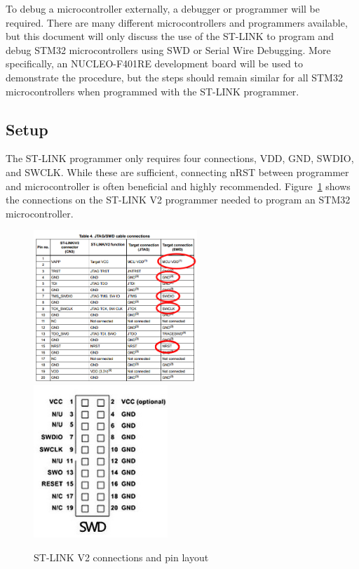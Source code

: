 \documentclass{article}
\begin{document}
  To debug a microcontroller externally, a debugger or programmer will be
  required. There are many different microcontrollers and programmers available,
  but this document will only discuss the use of the ST-LINK to program and
  debug STM32 microcontrollers using SWD or Serial Wire Debugging. More
  specifically, an NUCLEO-F401RE development board will be used to demonstrate
  the procedure, but the steps should remain similar for all STM32
  microcontrollers when programmed with the ST-LINK programmer.

  \subsection{Setup}

  The ST-LINK programmer only requires four connections, VDD, GND, SWDIO, and
  SWCLK. While these are sufficient, connecting nRST between programmer and
  microcontroller is often beneficial and highly recommended.
  Figure~\ref{fig:stlink_pinout} shows the connections on the ST-LINK V2
  programmer needed to program an STM32 microcontroller.

  \begin{figure}[h]
    \includegraphics[width=0.55\textwidth]{images/programming/stlink-pinout-circled.jpg}
    \includegraphics[width=0.45\textwidth]{images/programming/swd_connector.jpg}
    \caption{ST-LINK V2 connections and pin layout}
    \label{fig:stlink_pinout}
  \end{figure}
\end{document}
